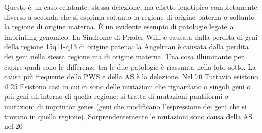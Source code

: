 \documentclass[11pt]{book}
\begin{document}
Questo è un caso eclatante: stessa delezione, ma effetto fenotipico completamente diverso a seconda che si esprima soltanto la regione di origine paterna o soltanto la regione di origine materna. È un evidente esempio di patologie legate a imprinting genomico.
La Sindrome di Prader-Willi è causata dalla perdita di geni della regione 15q11-q13 di origine patena; la Angelman è causata dalla perdita dei geni nella stessa regione ma di origine materna.
Una cosa illuminante per capire quali sono le differenze tra le due patologie è riassunta nella foto sotto. 
La causa più frequente della PWS e della AS è la delezione. Nel 70%
Tuttavia esistono il 25%
Esistono casi in cui ci sono delle mutazioni che riguardano o singoli geni o più geni all’interno di quella regione: si tratta di mutazioni puntiformi o mutazioni di imprintor genes (geni che modificano l’espressione dei geni che si trovano in quella regione).
Sorprendentemente le mutazioni sono causa della AS nel 20%
\end{document}
